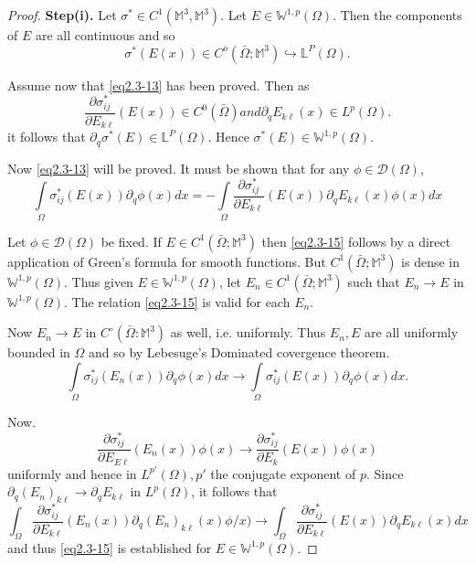 \begin{proof}
\noindent \textbf{Step(i).} Let $ \sigma^* \in C^1 ( \mathbb {M}^3,
\mathbb {M}^3)$. Let $E 
  \in \mathbb {W}^{1,p}(\Omega )$. Then the components of $E$ are all
  continuous and so 
  $$
  \sigma^* (E (x)) \in C^o ( \bar{\Omega}; \mathbb {M}^3)
  \hookrightarrow \mathbb {L} ^P ( \Omega ). 
  $$

  Assume now that \eqref{eq2.3-13} has been proved. Then as 
  $$
  \frac{\partial \sigma ^* _{ij}}{\partial E _{k \ell}} (E (x)) \in
  C^0 ( \bar{\Omega}) and \partial _q E_{k \ell} (x) \in L ^ p (\Omega
  ). 
  $$ 
  it follows that $ \partial _ q \sigma ^* (E) \in \mathbb {L}^P
  (\Omega )$. Hence $ \sigma^* (E) \in \mathbb{W}^{1,p}(\Omega)$. 

  Now \eqref{eq2.3-13} will be proved. It must be shown that for any
  $\phi \in \mathscr {D} (\Omega)$, 
  \begin{equation*}
    \int\limits _{\Omega} \sigma^*_{ij}(E (x)) \partial_q \phi (x)
    dx= - \int \limits _{\Omega} \frac{\partial \sigma^*
      _{ij}}{\partial E _{k \ell}} (E (x)) \partial_q E_{k \ell} (x)
    \phi (x) dx \tag{2.3-15}\label{eq2.3-15} 
  \end{equation*}

	Let $ \phi \in \mathscr {D} ( \Omega)$ be fixed. If $ E \in
        C^1 ( \bar{\Omega}; \mathbb {M}^3)$ then \eqref{eq2.3-15} follows by
        a direct application of Green's formula for smooth
        functions. But $C^1 ( \bar{\Omega}; \mathbb {M}^3 ) $ 	 is
        dense in $ \mathbb {W}^{1,p}(\Omega)$. Thus given $E \in
        \mathbb {W}^{1,p}(\Omega)$, let $ E_n \in C^1(\bar{\Omega};
        \mathbb {M}^3)$ 
        such that $E _n \to E $ in $ \mathbb {W}^{1,p}(\Omega)$. The
        relation \eqref{eq2.3-15} is valid for each $E_n$. 

	Now $E_n \to E $ in $C^\circ (\bar{\Omega}: \mathbb {M}^3)$ as
        well, i.e. uniformly. Thus $E_n, E$ are all uniformly bounded
        in $\Omega$ and so by Lebesuge's Dominated covergence
        theorem. 
  \begin{equation*}
    \int\limits_{\Omega} \sigma^*_{ij} (E_n (x))\partial_q \phi (x) dx \to
    \int\limits_{\Omega} \sigma^*_{ij} (E(x))\partial_q \phi (x)
    dx. \tag{2.3-16} \label{eq2.3-16}
  \end{equation*}

  Now.
  $$
  \frac{\partial \sigma^*_{i j}}{\partial E _{E \ell}} (E _n (x)) \phi
  (x) \to \frac{\partial \sigma^* _{ij}} {\partial E_k} (E (x)) \phi
  (x) 
  $$\pageoriginale
  uniformly and hence in $L^{p'} ( \Omega), p'$ the conjugate exponent
  of $p$. Since $\partial _q (E_n) _{k \ell} \to \partial _q E _{k
    \ell}$ in $L^p (\Omega )$, it follows that 
  \begin{equation*}
    \int_{\Omega} \frac{\partial \sigma^* _{i j}}{\partial E _{k
        \ell}} (E_n (x)) \partial _q (E_n)_{k \ell}(x) \phi/x)   
    \rightarrow \int_{\Omega}\frac{\partial \sigma^* _{i j}}{\partial E
      _{k \ell}} (E (x)) \partial_ q E _{k \ell}(x) dx
    \tag{2.3-17} \label{eq2.3-17} 
  \end{equation*}
  and thus \eqref{eq2.3-15} is established for $E \in \mathbb
  {W}^{1,p}(\Omega)$. 


\end{proof}

